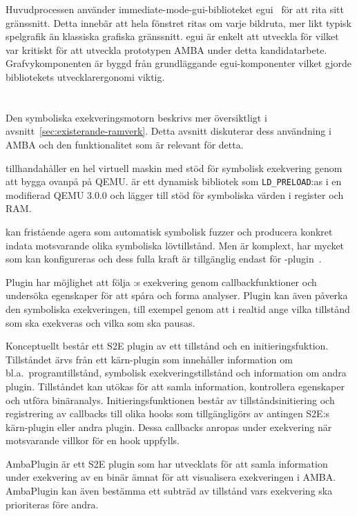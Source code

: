 Huvudprocessen använder immediate-mode-gui-biblioteket egui~\cite{egui} för att
rita sitt gränssnitt. Detta innebär att hela fönstret ritas om varje bildruta,
mer likt typisk spelgrafik än klassiska grafiska gränssnitt. egui är enkelt att
utveckla för vilket var kritiskt för att utveckla prototypen AMBA under detta
kandidatarbete. Grafvykomponenten är byggd från grundläggande egui-komponenter
vilket gjorde bibliotekets utvecklarergonomi viktig.

\section{\stoe{}}\label{sec:s2e}

Den symboliska exekveringsmotorn \stoe{} beskrivs mer översiktligt i
avsnitt~\ref{sec:existerande-ramverk}. Detta avsnitt diskuterar dess användning
i AMBA och den funktionalitet som är relevant för detta.\@

\stoe{} tillhandahåller en hel virtuell maskin med stöd för symbolisk exekvering
genom att bygga ovanpå på QEMU.\@ \stoe{} är ett dynamisk bibliotek som
\verb|LD_PRELOAD|:as i en modifierad QEMU 3.0.0 och lägger till stöd för
symboliska värden i register och RAM.\@

\stoe{} kan fristående agera som automatisk symbolisk fuzzer och producera
konkret indata motsvarande olika symboliska lövtillstånd. Men \stoe{} är
komplext, har mycket som kan konfigureras och dess fulla kraft är tillgänglig
endast för \stoe{}-plugin~\cite{Chipounov12}.

Plugin har möjlighet att följa \stoe{}:s exekvering genom callbackfunktioner och
undersöka egenskaper för att spåra och forma analyser. Plugin kan även påverka
den symboliska exekveringen, till exempel genom att i realtid ange vilka
tillstånd som ska exekveras och vilka som ska pausas.

Konceptuellt består ett S2E plugin av ett tillstånd och en initieringsfuktion.
Tillståndet ärvs från ett kärn-plugin som innehåller information om bl.a.\
programtillstånd, symbolisk exekveringstillstånd och information om andra
plugin. Tillståndet kan utökas för att samla information, kontrollera egenskaper
och utföra binäranalys. Initieringsfunktionen består av tillståndsinitiering och
registrering av callbacks till olika hooks som tillgängligörs av antingen S2E:s
kärn-plugin eller andra plugin. Dessa callbacks anropas under exekvering när
motsvarande villkor för en hook uppfylls.

AmbaPlugin är ett S2E plugin som har utvecklats för att samla information under
exekvering av en binär ämnat för att visualisera exekveringen i AMBA.\@
AmbaPlugin kan även bestämma ett subträd av tillstånd vars exekvering ska
prioriteras före andra.

